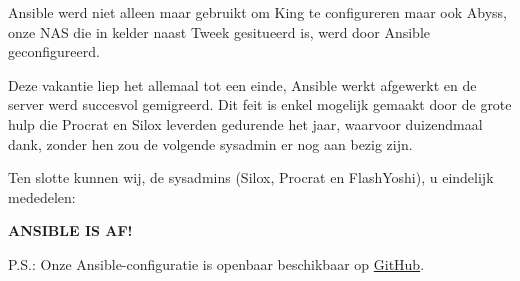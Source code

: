 \documentclass{article}
\begin{document}
Ansible werd niet alleen maar gebruikt om King te configureren maar ook Abyss, onze NAS die in kelder naast Tweek gesitueerd is, werd door Ansible geconfigureerd.

Deze vakantie liep het allemaal tot een einde, Ansible werkt afgewerkt en de server werd succesvol gemigreerd. \newline
Dit feit is enkel mogelijk gemaakt door de grote hulp die Procrat en Silox leverden gedurende het jaar, waarvoor duizendmaal dank, zonder hen zou de volgende sysadmin er nog aan bezig zijn.

Ten slotte kunnen wij, de sysadmins (Silox, Procrat en FlashYoshi), u eindelijk mededelen:

\textbf{ANSIBLE IS AF!}

{\small P.S.: Onze Ansible-configuratie is openbaar beschikbaar op \href{https://zeus.ugent.be/git/ansible-config}{GitHub}.}
\end{document}
